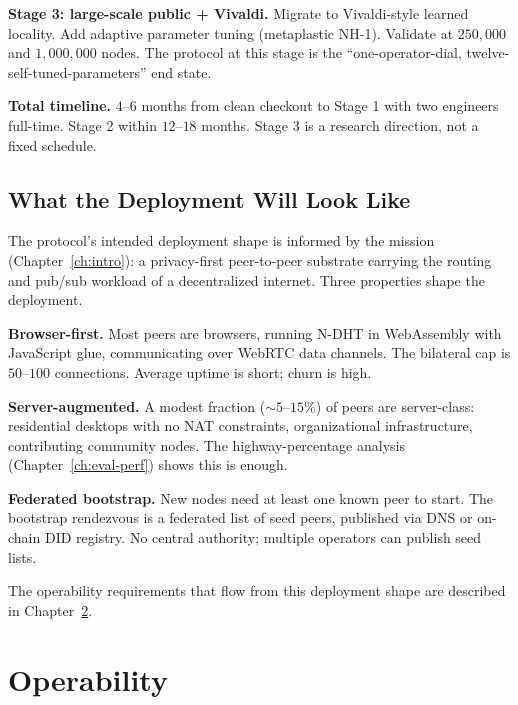 \documentclass[twoside,nobib]{tufte-book}
\newcommand{\NDHT}{N-DHT\xspace}
\begin{document}
\textbf{Stage 3: large-scale public + Vivaldi.} Migrate to
Vivaldi-style learned locality. Add adaptive parameter tuning
(metaplastic NH-1). Validate at $250{,}000$ and $1{,}000{,}000$
nodes. The protocol at this stage is the
``one-operator-dial, twelve-self-tuned-parameters'' end state.

\textbf{Total timeline.} $4$--$6$ months from clean checkout to
Stage 1 with two engineers full-time. Stage 2 within
$12$--$18$ months. Stage 3 is a research direction, not a
fixed schedule.

\section{What the Deployment Will Look Like}

The protocol's intended deployment shape is informed by the
mission (Chapter~\ref{ch:intro}): a privacy-first peer-to-peer
substrate carrying the routing and pub/sub workload of a
decentralized internet. Three properties shape the deployment.

\textbf{Browser-first.} Most peers are browsers, running
\NDHT in WebAssembly with JavaScript glue, communicating over
WebRTC data channels. The bilateral cap is $50$--$100$
connections. Average uptime is short; churn is high.

\textbf{Server-augmented.} A modest fraction
($\sim 5$--$15\%$) of peers are server-class: residential
desktops with no NAT constraints, organizational
infrastructure, contributing community nodes. The
highway-percentage analysis (Chapter~\ref{ch:eval-perf})
shows this is enough.

\textbf{Federated bootstrap.} New nodes need at least one
known peer to start. The bootstrap rendezvous is a federated
list of seed peers, published via DNS or on-chain DID
registry. No central authority; multiple operators can publish
seed lists.

The operability requirements that flow from this deployment
shape are described in Chapter~\ref{ch:operability}.


\chapter{Operability}
\label{ch:operability}
\end{document}

